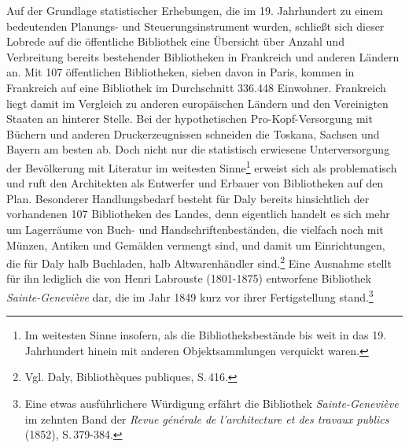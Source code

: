 Auf der Grundlage statistischer Erhebungen, die im 19. Jahrhundert zu
einem bedeutenden Planungs- und Steuerungsinstrument wurden, schließt
sich dieser Lobrede auf die öffentliche Bibliothek eine Übersicht über
Anzahl und Verbreitung bereits bestehender Bibliotheken in Frankreich
und anderen Ländern an. Mit 107 öffentlichen Bibliotheken, sieben davon
in Paris, kommen in Frankreich auf eine Bibliothek im Durchschnitt
336.448 Einwohner. Frankreich liegt damit im Vergleich zu anderen
europäischen Ländern und den Vereinigten Staaten an hinterer Stelle. Bei
der hypothetischen Pro-Kopf-Versorgung mit Büchern und anderen
Druckerzeugnissen schneiden die Toskana, Sachsen und Bayern am besten
ab. Doch nicht nur die statistisch erwiesene Unterversorgung der
Bevölkerung mit Literatur im weitesten Sinne\footnote{Im weitesten Sinne
  insofern, als die Bibliotheksbestände bis weit in das 19. Jahrhundert
  hinein mit anderen Objektsammlungen verquickt waren.} erweist sich als
problematisch und ruft den Architekten als Entwerfer und Erbauer von
Bibliotheken auf den Plan. Besonderer Handlungsbedarf besteht für Daly
bereits hinsichtlich der vorhandenen 107 Bibliotheken des Landes, denn
eigentlich handelt es sich mehr um Lagerräume von Buch- und
Handschriftenbeständen, die vielfach noch mit Münzen, Antiken und
Gemälden vermengt sind, und damit um Einrichtungen, die für Daly halb
Buchladen, halb Altwarenhändler sind.\footnote{Vgl. Daly, Bibliothèques
  publiques, S.\,416.} Eine Ausnahme stellt für ihn lediglich die von
Henri Labrouste (1801-1875) entworfene Bibliothek
\emph{Sainte-Geneviève} dar, die im Jahr 1849 kurz vor ihrer
Fertigstellung stand.\footnote{Eine etwas ausführlichere Würdigung
  erfährt die Bibliothek \emph{Sainte-Geneviève} im zehnten Band der
  \emph{Revue générale de l'architecture et des travaux publics} (1852),
  S.\,379-384.}

